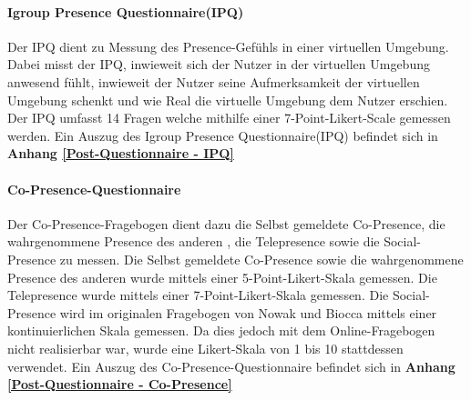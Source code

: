 \documentclass[a4paper,11pt]{article}%
\renewcommand{\\}{\vspace*{0.5\baselineskip} \newline}
\begin{document}
		\paragraph{Igroup Presence Questionnaire(IPQ)}
Der IPQ dient zu Messung des Presence-Gefühls in einer virtuellen Umgebung. Dabei misst der IPQ, inwieweit sich der Nutzer in der virtuellen Umgebung anwesend fühlt, inwieweit der Nutzer seine Aufmerksamkeit der virtuellen Umgebung schenkt und wie Real die virtuelle Umgebung dem Nutzer erschien. Der IPQ umfasst 14 Fragen welche mithilfe einer 7-Point-Likert-Scale gemessen werden.
\\Ein Auszug des Igroup Presence Questionnaire(IPQ) befindet sich in \textbf{Anhang \ref{Post-Questionnaire - IPQ}}
		
		\paragraph{Co-Presence-Questionnaire}
Der Co-Presence-Fragebogen dient dazu die Selbst gemeldete Co-Presence, die wahrgenommene Presence des \dq{}anderen \dq{}, die Telepresence sowie die Social-Presence zu messen. Die Selbst gemeldete Co-Presence sowie die wahrgenommene Presence des \dq{}anderen \dq{} wurde mittels einer 5-Point-Likert-Skala gemessen. Die Telepresence wurde mittels einer 7-Point-Likert-Skala gemessen. Die Social-Presence wird im originalen Fragebogen von Nowak und Biocca mittels einer kontinuierlichen Skala gemessen. Da dies jedoch mit dem Online-Fragebogen nicht realisierbar war, wurde eine Likert-Skala von 1 bis 10 stattdessen verwendet. \citep[p.487]{nowak2004effect}
\\Ein Auszug des Co-Presence-Questionnaire befindet sich in \textbf{Anhang \ref{Post-Questionnaire - Co-Presence}}
\end{document}
